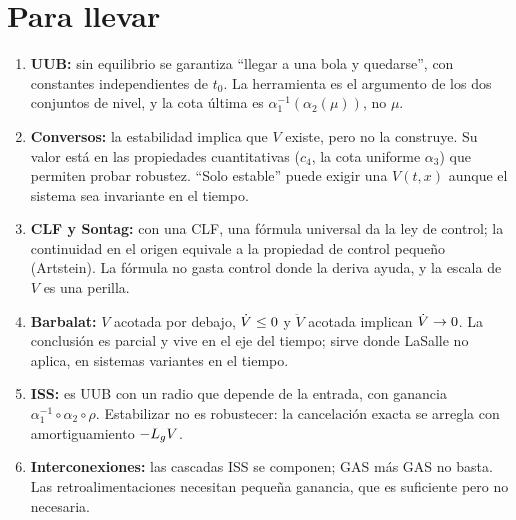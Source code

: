 \section{Para llevar}
\label{sec:av-cierre}

\begin{parallevar}
\begin{enumerate}
  \item \textbf{UUB:} sin equilibrio se garantiza ``llegar a una bola y quedarse'', con constantes independientes de $t_0$. La herramienta es el argumento de los dos conjuntos de nivel, y la cota última es $\alpha_1^{-1}(\alpha_2(\mu))$, no $\mu$.
  \item \textbf{Conversos:} la estabilidad implica que $V$ existe, pero no la construye. Su valor está en las propiedades cuantitativas ($c_4$, la cota uniforme $\alpha_3$) que permiten probar robustez. ``Solo estable'' puede exigir una $V(t,x)$ aunque el sistema sea invariante en el tiempo.
  \item \textbf{CLF y Sontag:} con una CLF, una fórmula universal da la ley de control; la continuidad en el origen equivale a la propiedad de control pequeño (Artstein). La fórmula no gasta control donde la deriva ayuda, y la escala de $V$ es una perilla.
  \item \textbf{Barbalat:} $V$ acotada por debajo, $\dot V\le0$ y $\ddot V$ acotada implican $\dot V\to0$. La conclusión es parcial y vive en el eje del tiempo; sirve donde LaSalle no aplica, en sistemas variantes en el tiempo.
  \item \textbf{ISS:} es UUB con un radio que depende de la entrada, con ganancia $\alpha_1^{-1}\circ\alpha_2\circ\rho$. Estabilizar no es robustecer: la cancelación exacta se arregla con amortiguamiento $-L_{g}V$.
  \item \textbf{Interconexiones:} las cascadas ISS se componen; GAS más GAS no basta. Las retroalimentaciones necesitan pequeña ganancia, que es suficiente pero no necesaria.
\end{enumerate}
\end{parallevar}

